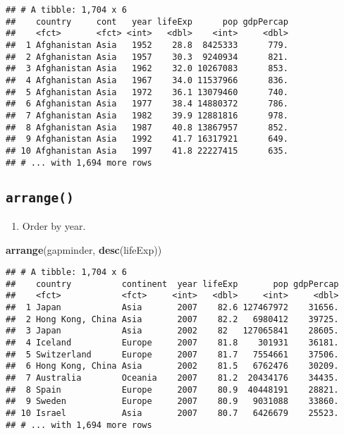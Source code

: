\documentclass[]{article}
\newenvironment{Shaded}{\begin{snugshade}}{\end{snugshade}}
\newcommand{\KeywordTok}[1]{\textcolor[rgb]{0.13,0.29,0.53}{\textbf{{#1}}}}
\newcommand{\NormalTok}[1]{{#1}}
\providecommand{\tightlist}{%
  \setlength{\itemsep}{0pt}\setlength{\parskip}{0pt}}
\begin{document}
\begin{verbatim}
## # A tibble: 1,704 x 6
##    country     cont   year lifeExp      pop gdpPercap
##    <fct>       <fct> <int>   <dbl>    <int>     <dbl>
##  1 Afghanistan Asia   1952    28.8  8425333      779.
##  2 Afghanistan Asia   1957    30.3  9240934      821.
##  3 Afghanistan Asia   1962    32.0 10267083      853.
##  4 Afghanistan Asia   1967    34.0 11537966      836.
##  5 Afghanistan Asia   1972    36.1 13079460      740.
##  6 Afghanistan Asia   1977    38.4 14880372      786.
##  7 Afghanistan Asia   1982    39.9 12881816      978.
##  8 Afghanistan Asia   1987    40.8 13867957      852.
##  9 Afghanistan Asia   1992    41.7 16317921      649.
## 10 Afghanistan Asia   1997    41.8 22227415      635.
## # ... with 1,694 more rows
\end{verbatim}

\subsection{\texorpdfstring{\texttt{arrange()}}{arrange()}}\label{arrange}

\begin{enumerate}
\def\labelenumi{\arabic{enumi}.}
\tightlist
\item
  Order by year.
\end{enumerate}

\begin{Shaded}
\begin{Highlighting}[]
\KeywordTok{arrange}\NormalTok{(gapminder, }\KeywordTok{desc}\NormalTok{(lifeExp))}
\end{Highlighting}
\end{Shaded}

\begin{verbatim}
## # A tibble: 1,704 x 6
##    country          continent  year lifeExp       pop gdpPercap
##    <fct>            <fct>     <int>   <dbl>     <int>     <dbl>
##  1 Japan            Asia       2007    82.6 127467972    31656.
##  2 Hong Kong, China Asia       2007    82.2   6980412    39725.
##  3 Japan            Asia       2002    82   127065841    28605.
##  4 Iceland          Europe     2007    81.8    301931    36181.
##  5 Switzerland      Europe     2007    81.7   7554661    37506.
##  6 Hong Kong, China Asia       2002    81.5   6762476    30209.
##  7 Australia        Oceania    2007    81.2  20434176    34435.
##  8 Spain            Europe     2007    80.9  40448191    28821.
##  9 Sweden           Europe     2007    80.9   9031088    33860.
## 10 Israel           Asia       2007    80.7   6426679    25523.
## # ... with 1,694 more rows
\end{verbatim}
\end{document}
